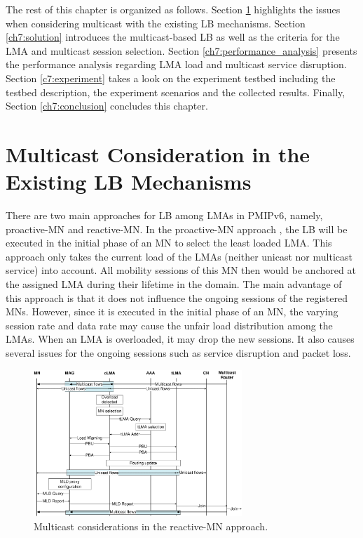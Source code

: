 The rest of this chapter is organized as follows. Section \ref{ch7:existing_solution} highlights the issues when considering multicast with the existing LB mechanisms. Section \ref{ch7:solution} introduces the multicast-based LB as well as the criteria for the LMA and multicast session selection. Section \ref{ch7:performance_analysis} presents the performance analysis regarding LMA load and multicast service disruption. Section \ref{c7:experiment} takes a look on the experiment testbed including the testbed description, the experiment scenarios and the collected results. Finally, Section \ref{ch7:conclusion} concludes this chapter.

\section{Multicast Consideration in the Existing LB Mechanisms}\label{ch7:existing_solution}
There are two main approaches for LB among LMAs in PMIPv6, namely, proactive-MN and reactive-MN. In the proactive-MN approach \cite{runtime_lma, lma_discovery}, the LB will be executed in the initial phase of an MN to select the least loaded LMA. This approach only takes the current load of the LMAs (neither unicast nor multicast service) into account. All mobility sessions of this MN then would be anchored at the assigned LMA during their lifetime in the domain. The main advantage of this approach is that it does not influence the ongoing sessions of the registered MNs. However, since it is executed in the initial phase of an MN, the varying session rate and data rate may cause the unfair load distribution among the LMAs. When an LMA is overloaded, it may drop the new sessions. It also causes several issues for the ongoing sessions such as service disruption and packet loss. 
\begin{figure}[h!] 
 \begin{center} 
 \includegraphics[width=0.70\textwidth]{./Part2/Chapter5/figures/reactive_MN_flow.eps} 
    \caption[Multicast considerations in the reactive-MN load balancing approach.]{Multicast considerations in the reactive-MN approach.}
     \label{fig:reactive_MN_flow}
  \end{center} 
\end{figure}


